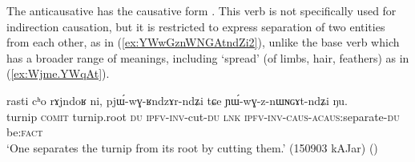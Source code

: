% 

The anticausative  has the causative form . This verb is not specifically used for indirection causation, but it is restricted to express separation of two entities from each other, as in (\ref{ex:YWwGznWNGAtndZi2}), unlike the base verb  which has a broader range of meanings, including `spread' (of limbs, hair, feathers) as in (\ref{ex:Wjme.YWqAt}).

\begin{exe}
\ex \label{ex:YWwGznWNGAtndZi2}
\gll rasti cʰo rɤjndoʁ ni, pjɯ́-wɣ-ʁndzɤr-ndʑi tɕe ɲɯ́-wɣ-z-nɯɴɢɤt-ndʑi ŋu.\\
turnip \textsc{comit} turnip.root \textsc{du} \textsc{ipfv}-\textsc{inv}-cut-\textsc{du} \textsc{lnk} \textsc{ipfv}-\textsc{inv}-\textsc{caus}-\textsc{acaus}:separate-\textsc{du} be:\textsc{fact}\\
\glt `One separates the turnip from its root by cutting them.' (150903 kAJar)
()
\end{exe}

